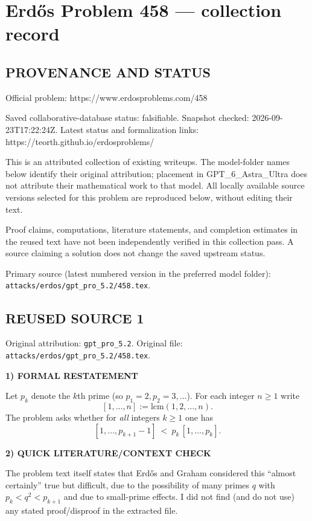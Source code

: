 \section*{Erd\H{o}s Problem 458 --- collection record}

\subsection*{PROVENANCE AND STATUS}
Official problem: https://www.erdosproblems.com/458

Saved collaborative-database status: falsifiable.
Snapshot checked: 2026-09-23T17:22:24Z.
Latest status and formalization links: https://teorth.github.io/erdosproblems/

This is an attributed collection of existing writeups. The model-folder names below identify their original attribution; placement in GPT\_6\_Astra\_Ultra does not attribute their mathematical work to that model. All locally available source versions selected for this problem are reproduced below, without editing their text.

Proof claims, computations, literature statements, and completion estimates in the reused text have not been independently verified in this collection pass. A source claiming a solution does not change the saved upstream status.

Primary source (latest numbered version in the preferred model folder): \texttt{attacks/erdos/gpt\_pro\_5.2/458.tex}.

\subsection*{REUSED SOURCE 1}
Original attribution: \texttt{gpt\_pro\_5.2}.
Original file: \texttt{attacks/erdos/gpt\_pro\_5.2/458.tex}.


\noindent\textbf{1) FORMAL RESTATEMENT}

Let $p_k$ denote the $k$th prime (so $p_1=2,p_2=3,\dots$).  For each integer $n\ge 1$ write
\[[1,\dots,n]:=\mathrm{lcm}(1,2,\dots,n).
\]
The problem asks whether for \emph{all} integers $k\ge 1$ one has
\[[1,\dots,p_{k+1}-1]\ <\ p_k\,[1,\dots,p_k].\]

\noindent\textbf{2) QUICK LITERATURE/CONTEXT CHECK}

The problem text itself states that Erd\H{o}s and Graham considered this ``almost certainly'' true but difficult, due to the possibility of many primes $q$ with $p_k<q^2<p_{k+1}$ and due to small-prime effects. I did not find (and do not use) any stated proof/disproof in the extracted file.

